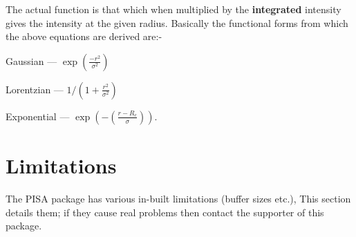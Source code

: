 The actual function is that which when multiplied by the {\bf
integrated} intensity gives the intensity at the given radius. Basically the
functional forms from which the above equations are derived are:-
\begin{description}
\item Gaussian --- $\exp(\frac{-r^{2}}{\sigma^{2}})$

\item Lorentzian --- $1/(1+\frac{r^{2}}{\sigma^{2}})$

\item Exponential --- $\exp(-(\frac{r-R_{c}}{\sigma}))$.
\end{description}

\section{Limitations}

The PISA package has various in-built limitations (buffer sizes etc.), This
section details them; if they cause real problems then contact the supporter of
this package.


